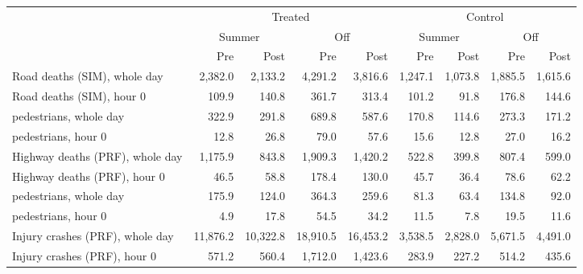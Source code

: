 \begin{tabular}{l rrrr rrrr}
\toprule
 & \multicolumn{4}{c}{Treated} & \multicolumn{4}{c}{Control} \\
\cmidrule(lr){2-5}\cmidrule(lr){6-9}
 & \multicolumn{2}{c}{Summer} & \multicolumn{2}{c}{Off} & \multicolumn{2}{c}{Summer} & \multicolumn{2}{c}{Off} \\
 & Pre & Post & Pre & Post & Pre & Post & Pre & Post \\
\midrule
Road deaths (SIM), whole day & 2,382.0 & 2,133.2 & 4,291.2 & 3,816.6 & 1,247.1 & 1,073.8 & 1,885.5 & 1,615.6 \\
Road deaths (SIM), hour 0 & 109.9 & 140.8 & 361.7 & 313.4 & 101.2 & 91.8 & 176.8 & 144.6 \\
\quad pedestrians, whole day & 322.9 & 291.8 & 689.8 & 587.6 & 170.8 & 114.6 & 273.3 & 171.2 \\
\quad pedestrians, hour 0 & 12.8 & 26.8 & 79.0 & 57.6 & 15.6 & 12.8 & 27.0 & 16.2 \\
Highway deaths (PRF), whole day & 1,175.9 & 843.8 & 1,909.3 & 1,420.2 & 522.8 & 399.8 & 807.4 & 599.0 \\
Highway deaths (PRF), hour 0 & 46.5 & 58.8 & 178.4 & 130.0 & 45.7 & 36.4 & 78.6 & 62.2 \\
\quad pedestrians, whole day & 175.9 & 124.0 & 364.3 & 259.6 & 81.3 & 63.4 & 134.8 & 92.0 \\
\quad pedestrians, hour 0 & 4.9 & 17.8 & 54.5 & 34.2 & 11.5 & 7.8 & 19.5 & 11.6 \\
Injury crashes (PRF), whole day & 11,876.2 & 10,322.8 & 18,910.5 & 16,453.2 & 3,538.5 & 2,828.0 & 5,671.5 & 4,491.0 \\
Injury crashes (PRF), hour 0 & 571.2 & 560.4 & 1,712.0 & 1,423.6 & 283.9 & 227.2 & 514.2 & 435.6 \\
\bottomrule
\end{tabular}
